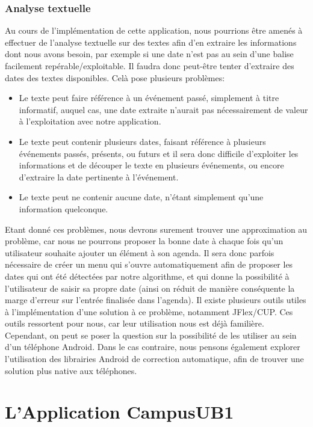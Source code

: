\documentclass [pdftex,12pt] {report}
\begin{document}
\subsection{Analyse textuelle}
Au cours de l'implémentation de cette application, nous pourrions être amenés à effectuer de l'analyse textuelle sur des textes afin d'en extraire les informations dont nous avons besoin, par exemple si une date n'est pas au sein d'une balise facilement repérable/exploitable. Il faudra donc peut-être tenter d'extraire des dates des textes disponibles. Celà pose plusieurs problèmes:
\begin{itemize}
\renewcommand{\labelitemi}{$\bullet$}
  \item Le texte peut faire référence à un événement passé, simplement à titre informatif, auquel cas, une date extraite n'aurait pas nécessairement de valeur à l'exploitation avec notre application.
  \item Le texte peut contenir plusieurs dates, faisant référence à plusieurs événements passés, présents, ou futurs et il sera donc difficile d'exploiter les informations et de découper le texte en plusieurs événements, ou encore d'extraire la date pertinente à l'événement.
  \item Le texte peut ne contenir aucune date, n'étant simplement qu'une information quelconque.
\end{itemize}
Etant donné ces problèmes, nous devrons surement trouver une approximation au problème, car nous ne pourrons proposer la bonne date à chaque fois qu'un utilisateur souhaite ajouter un élément à son agenda. Il sera donc parfois nécessaire de créer un menu qui s'ouvre automatiquement afin de proposer les dates qui ont été détectées par notre algorithme, et qui donne la possibilité à l'utilisateur de saisir sa propre date (ainsi on réduit de manière conséquente la marge d'erreur sur l'entrée finalisée dans l'agenda).
Il existe plusieurs outils utiles à l'implémentation d'une solution à ce problème, notamment JFlex/CUP. Ces outils ressortent pour nous, car leur utilisation nous est déjà familière. Cependant, on peut se poser la question sur la possibilité de les utiliser au sein d'un téléphone Android. Dans le cas contraire, nous pensons également explorer l'utilisation des librairies Android de correction automatique, afin de trouver une solution plus native aux téléphones.


\chapter{L'Application CampusUB1}
\end{document}
